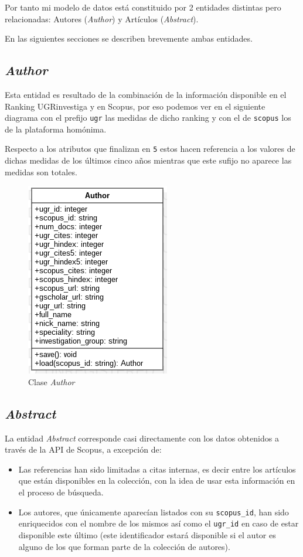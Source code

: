 Por tanto mi modelo de datos está constituido por 2 entidades distintas pero relacionadas: Autores (\textit{Author}) y Artículos (\textit{Abstract}). 

En las siguientes secciones se describen brevemente ambas entidades.


\subsection{\textit{Author}}

Esta entidad es resultado de la combinación de la información disponible en el Ranking UGRinvestiga \cite{Ranking_UGRInvestiga} y en Scopus, por eso podemos ver en el siguiente diagrama con el prefijo \texttt{ugr} las medidas de dicho ranking y con el de \texttt{scopus} los de la plataforma homónima. 

Respecto a los atributos que finalizan en \texttt{5} estos hacen referencia a los valores de dichas medidas de los últimos cinco años mientras que este sufijo no aparece las medidas son totales.

\begin{figure}[ht]
	
	\centering
	\includegraphics[width=0.4\linewidth]{imagenes/Author}
	\caption{Clase \textit{Author}}
\end{figure}

\newpage

\subsection{\textit{Abstract}}

La entidad \textit{Abstract} corresponde casi directamente con los datos obtenidos a través de la \acrshort{API} de Scopus, a excepción de:
\begin{itemize}
	\item Las referencias han sido limitadas a citas internas, es decir entre los artículos que están disponibles en la colección, con la idea de usar esta información en el proceso de búsqueda.
	\item Los autores, que únicamente aparecían listados con su \texttt{scopus\_id}, han sido enriquecidos con el nombre de los mismos así como el \texttt{ugr\_id} en caso de estar disponible este último (este identificador estará disponible si el autor es alguno de los que forman parte de la colección de autores).
\end{itemize}

